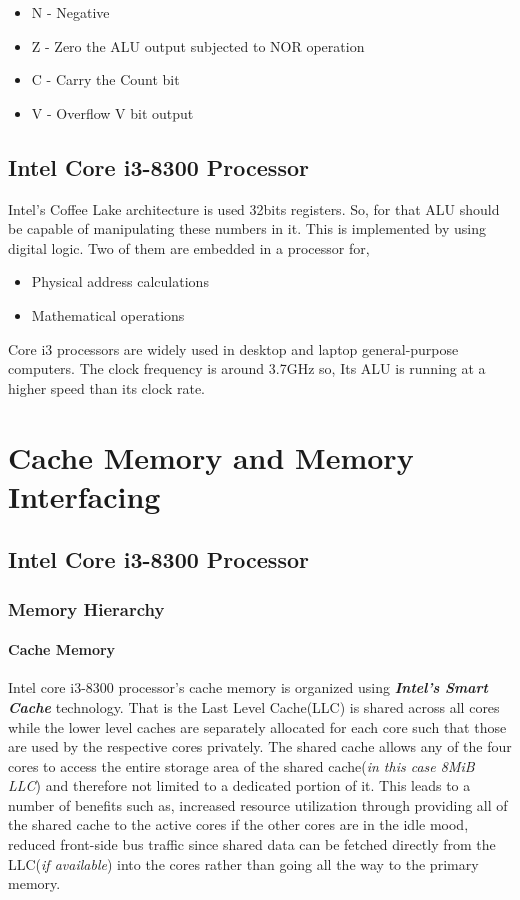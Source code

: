 \documentclass[a4paper,11pt]{article}
\begin{document}
\begin{itemize}
	\item 	N - Negative
\item	Z - Zero the ALU output subjected to NOR operation
\item 	C - Carry the Count bit
\item	V - Overflow V bit output
\end{itemize}

\subsection{Intel Core i3-8300 Processor}

Intel's Coffee Lake architecture is used 32bits registers. So, for that ALU should be capable of manipulating these numbers in it. This is implemented by using digital logic. Two of them are embedded in a processor for,
\begin{itemize}
	\item 	Physical address calculations
	\item	Mathematical operations

\end{itemize}

Core i3 processors are widely used in desktop and laptop general-purpose computers. The clock frequency is around 3.7GHz so, Its ALU is running at a higher speed than its clock rate.


\section{Cache Memory and Memory Interfacing}

\subsection{Intel Core i3-8300 Processor}

\subsubsection{Memory Hierarchy}

\paragraph{Cache Memory}
Intel core i3-8300 processor's cache memory is organized using \textbf{\textit{Intel's Smart Cache}} technology. That is the Last Level Cache(LLC) is shared across all cores while the lower level caches are separately allocated for each core such that those  are used by the respective cores privately. The shared cache allows any of the four cores to access the entire storage area of the shared cache(\textit{in this case 8MiB LLC}) and therefore not limited to a dedicated portion of it. This leads to a number of benefits such as, increased resource utilization through providing all of the shared cache to the active cores if the other cores are in the idle mood, reduced front-side bus traffic since shared data can be fetched directly from the LLC(\textit{if available}) into the cores  rather than going all the way to the primary memory.\\
\end{document}

